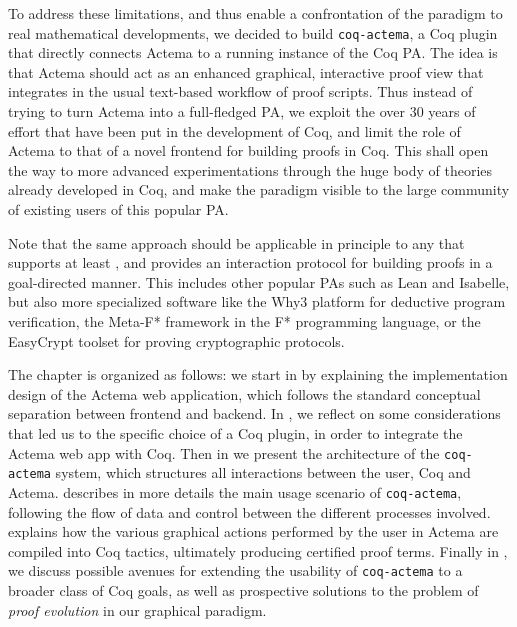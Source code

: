 To address these limitations, and thus enable a confrontation of the
 paradigm to real mathematical developments, we decided to build
\texttt{coq-actema}, a Coq plugin that directly connects Actema to a running
instance of the Coq PA. The idea is that Actema should act as an enhanced
graphical, interactive proof view that integrates in the usual text-based
workflow of proof scripts. Thus instead of trying to turn Actema into a
full-fledged PA, we exploit the over 30 years of effort that have been put in
the development of Coq, and limit the role of Actema to that of a novel frontend
for building proofs in Coq. This shall open the way to more advanced
experimentations through the huge body of theories already developed in Coq, and
make the  paradigm visible to the large community of existing
users of this popular PA.

Note that the same approach should be applicable in principle to any  that
supports at least , and provides an interaction protocol for building proofs
in a goal-directed manner. This includes other popular PAs such as Lean and
Isabelle, but also more specialized software like the Why3 platform for
deductive program verification, the Meta-F* framework in the F* programming
language, or the EasyCrypt toolset for proving cryptographic protocols.


The chapter is organized as follows: we start in  by explaining
the implementation design of the Actema web application, which follows the
standard conceptual separation between frontend and backend. In
, we reflect on some considerations that led us to the
specific choice of a Coq plugin, in order to integrate the Actema web app with
Coq. Then in  we present the architecture of the
\texttt{coq-actema} system, which structures all interactions between the user,
Coq and Actema.  describes in more details the main usage
scenario of \texttt{coq-actema}, following the flow of data and control between
the different processes involved.  explains how the various
graphical actions performed by the user in Actema are compiled into Coq tactics,
ultimately producing certified proof terms. Finally in , we
discuss possible avenues for extending the usability of \texttt{coq-actema} to a
broader class of Coq goals, as well as prospective solutions to the problem of
\emph{proof evolution} in our graphical paradigm.

